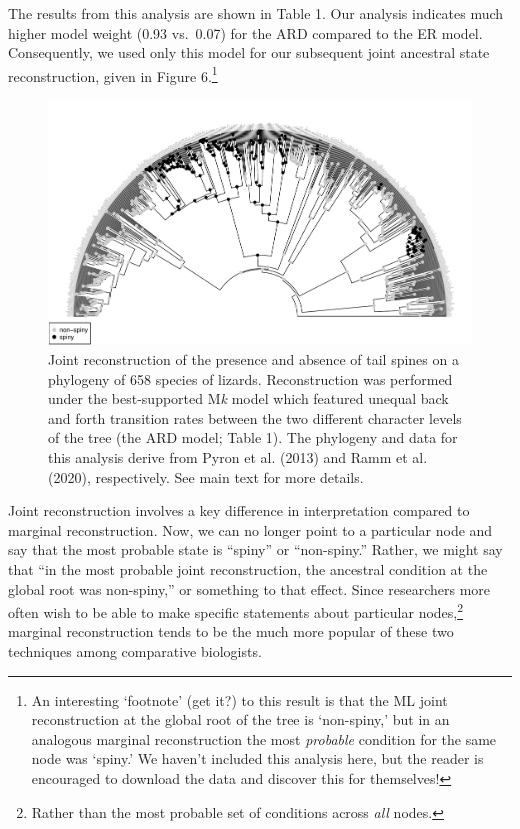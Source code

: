 \documentclass{article}
\begin{document}
The results from this analysis are shown in Table 1. Our analysis indicates much higher model weight (0.93 vs.~0.07) for the ARD compared to the ER model. Consequently, we used only this model for our subsequent joint ancestral state reconstruction, given in Figure 6.\footnote{An interesting `footnote' (get it?) to this result is that the ML joint reconstruction at the global root of the tree is `non-spiny,' but in an analogous marginal reconstruction the most \emph{probable} condition for the same node was `spiny.' We haven't included this analysis here, but the reader is encouraged to download the data and discover this for themselves!}

\begin{figure}
\includegraphics[width=1\linewidth]{Revell.AncestralReconstruction_files/figure-latex/fig6-1} \caption{Joint reconstruction of the presence and absence of tail spines on a phylogeny of 658 species of lizards. Reconstruction was performed under the best-supported M\emph{k} model which featured unequal back and forth transition rates between the two different character levels of the tree (the ARD model; Table 1). The phylogeny and data for this analysis derive from Pyron et al. (2013) and Ramm et al. (2020), respectively. See main text for more details.}\label{fig:fig6}
\end{figure}

Joint reconstruction involves a key difference in interpretation compared to marginal reconstruction. Now, we can no longer point to a particular node and say that the most probable state is ``spiny'' or ``non-spiny.'' Rather, we might say that ``in the most probable joint reconstruction, the ancestral condition at the global root was non-spiny,'' or something to that effect. Since researchers more often wish to be able to make specific statements about particular nodes,\footnote{Rather than the most probable set of conditions across \emph{all} nodes.} marginal reconstruction tends to be the much more popular of these two techniques among comparative biologists.
\end{document}

